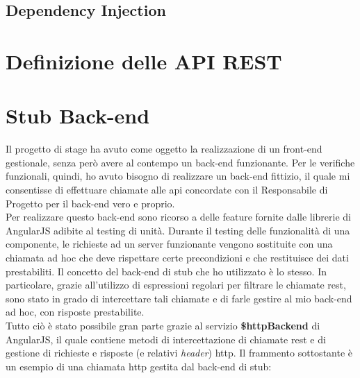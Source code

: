 \subsection{Dependency Injection}


\section{Definizione delle API REST}



\section{Stub Back-end}
Il progetto di stage ha avuto come oggetto la realizzazione di un \gls{front-end} gestionale, senza però avere al contempo un \gls{back-end} funzionante. Per le verifiche funzionali, quindi, ho avuto bisogno di realizzare un \gls{back-end} fittizio, il quale mi consentisse di effettuare chiamate alle \gls{api} concordate con il Responsabile di Progetto per il \gls{back-end} vero e proprio.\\
Per realizzare questo \gls{back-end} sono ricorso a delle feature fornite dalle librerie di AngularJS adibite al testing di unità. Durante il testing delle funzionalità di una componente, le richieste ad un server funzionante vengono sostituite con una chiamata ad hoc che deve rispettare certe precondizioni e che restituisce dei dati prestabiliti. Il concetto del \gls{back-end} di \gls{stub} che ho utilizzato è lo stesso. In particolare, grazie all'utilizzo di espressioni regolari per filtrare le chiamate \gls{rest}, sono stato in grado di intercettare tali chiamate e di farle gestire al mio \gls{back-end} ad hoc, con risposte prestabilite.\\
Tutto ciò è stato possibile gran parte grazie al servizio \textbf{\$httpBackend} di AngularJS, il quale contiene metodi di intercettazione di chiamate \gls{rest} e di gestione di richieste e risposte (e relativi \emph{header}) \gls{http}. Il frammento sottostante è un esempio di una chiamata \gls{http} gestita dal \gls{back-end} di \gls{stub}:

